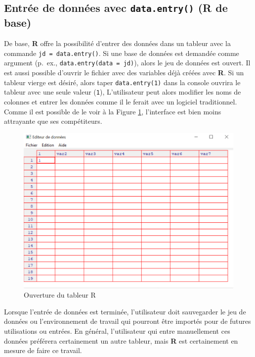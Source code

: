 \documentclass[
]{book}
\begin{document}
\hypertarget{entruxe9e-de-donnuxe9es-avec-data.entry-r-de-base}{%
\subsection{\texorpdfstring{Entrée de données avec \texttt{data.entry()} (R de base)}{Entrée de données avec data.entry() (R de base)}}\label{entruxe9e-de-donnuxe9es-avec-data.entry-r-de-base}}

De base, \textbf{R} offre la possibilité d'entrer des données dans un tableur avec la commande \texttt{jd\ =\ data.entry()}. Si une base de données est demandée comme argument (p.~ex., \texttt{data.entry(data\ =\ jd)}), alors le jeu de données est ouvert. Il est aussi possible d'ouvrir le fichier avec des variables déjà créées avec \textbf{R}. Si un tableur vierge est désiré, alors taper \texttt{data.entry(1)} dans la console ouvrira le tableur avec une seule valeur (\texttt{1}), L'utilisateur peut alors modifier les noms de colonnes et entrer les données comme il le ferait avec un logiciel traditionnel. Comme il est possible de le voir à la Figure \ref{fig:dataentry}, l'interface est bien moins attrayante que ses compétiteurs.

\begin{figure}

{\centering \includegraphics[width=0.75\linewidth]{image//data_entry} 

}

\caption{Ouverture du tableur R}\label{fig:dataentry}
\end{figure}

Lorsque l'entrée de données est terminée, l'utilisateur doit sauvegarder le jeu de données ou l'environnement de travail qui pourront être importés pour de futures utilisations ou entrées. En général, l'utilisateur qui entre manuellement ces données préférera certainement un autre tableur, mais \textbf{R} est certainement en mesure de faire ce travail.
\end{document}
